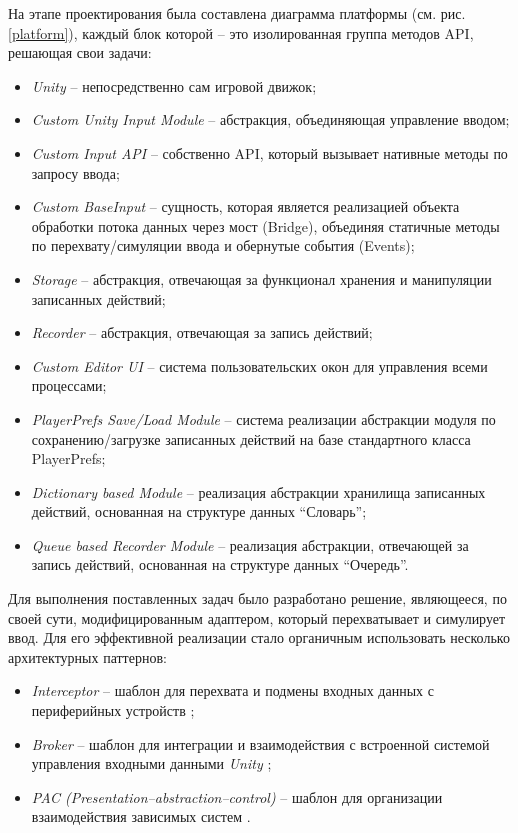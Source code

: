 На этапе проектирования была составлена диаграмма платформы (см. рис. \ref{platform}), каждый блок которой -- это изолированная группа методов API, решающая свои задачи: 
\begin{itemize}
	\item \textit{Unity} -- непосредственно сам игровой движок;
	\item \textit{Custom Unity Input Module} -- абстракция, объединяющая управление вводом;
	\item \textit{Custom Input API} -- собственно API, который вызывает нативные методы по запросу ввода;
	\item \textit{Custom BaseInput} -- сущность, которая является реализацией объекта обработки потока данных через мост (Bridge), объединяя статичные методы по перехвату/симуляции ввода и обернутые события (Events);
	\item \textit{Storage} -- абстракция, отвечающая за функционал хранения и манипуляции записанных действий;
	\item \textit{Recorder} -- абстракция, отвечающая за запись действий;
	\item \textit{Custom Editor UI} -- система пользовательских окон для управления всеми процессами;
	\item \textit{PlayerPrefs Save/Load Module} -- система реализации абстракции модуля по сохранению/загрузке записанных действий на базе стандартного класса PlayerPrefs;
	\item \textit{Dictionary based Module} -- реализация абстракции хранилища записанных действий, основанная на структуре данных ``Словарь'';
	\item \textit{Queue based Recorder Module} -- реализация абстракции, отвечающей за запись действий, основанная на структуре данных ``Очередь''.
\end{itemize}

Для выполнения поставленных задач было разработано решение, являющееся, по своей сути, модифицированным адаптером, который перехватывает и симулирует ввод. Для его эффективной реализации стало органичным использовать несколько архитектурных паттернов:
\begin{itemize}
	\item
	\textit{Interceptor} -- шаблон для перехвата и подмены входных данных с периферийных устройств \cite{interceptor};
	\item
	\textit{Broker} -- шаблон для интеграции и взаимодействия с встроенной системой управления входными данными \textit{Unity} \cite{broker};
	\item
	\textit{PAC (Presentation–abstraction–control)} -- шаблон для организации взаимодействия зависимых систем \cite{pac}.
\end{itemize}

